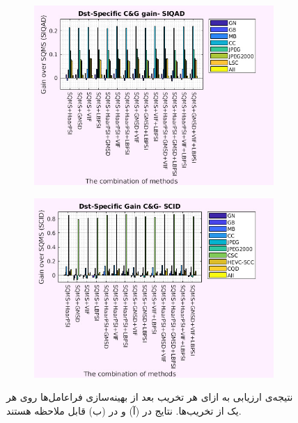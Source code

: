 \documentclass[twocolumn]{article}
\begin{document}
\begin{figure}
	\begin{subfigure}{0.47\textwidth}
		\includegraphics[width=\textwidth]{per_distortion_hyper_SIQAD}
		\caption{}
		\label{fig:res_per_distortion_SIQAD_hyper}
	\end{subfigure} 
	\hfill
	\begin{subfigure}{0.47\textwidth}
		\includegraphics[width=\textwidth]{per_distortion_hyper_SCID}
		\caption{}
		\label{fig:res_per_distortion_SCID_hyper}
	\end{subfigure}
	\caption{نتیجه‌ی ارزیابی به ازای هر تخریب بعد از بهینه‌سازی فراعامل‌ها روی هر یک از تخریب‌ها. نتایج  در (آ) و  در (ب) قابل ملاحظه هستند.}
	\label{fig:res_per_dist_hyper}
\end{figure}
\end{document}
